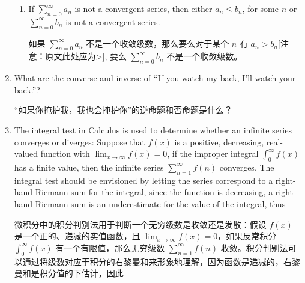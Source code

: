 \begin{enumerate}
{\begin{enumerate}
  如果没有云，就不可能下雨。
  \item If  $\sum_{n=0}^\infty a_n$ is not a convergent series, then either $a_n \leq b_n$, for some $n$ or 
  $\sum_{n=0}^\infty b_n$ is not a convergent series.
  
  如果 $\sum_{n=0}^\infty a_n$ 不是一个收敛级数，那么要么对于某个 $n$ 有 $a_n > b_n$[注意：原文此处应为>], 要么 $\sum_{n=0}^\infty b_n$ 不是一个收敛级数。
  \end{enumerate}
  }
  \rule{0pt}{0pt}
  
  
  \workbookpagebreak
  
  \item What are the converse and inverse of ``If you watch my back, I'll 
  watch your back.''?
  
  “如果你掩护我，我也会掩护你”的逆命题和否命题是什么？
  \wbvfill
  
  
  
  
  \item The integral test in Calculus is used to determine whether an
  infinite series converges or diverges:   Suppose that $f(x)$ is a positive,
  decreasing, 
  real-valued function with $\lim_{x \longrightarrow \infty} f(x) = 0$, if
  the improper integral
  $\int_0^\infty f(x)$ has a finite value, then the infinite series 
  $\sum_{n=1}^\infty f(n)$ converges.
  The integral test should be envisioned by letting the series correspond
  to a right-hand Riemann sum for the integral, since the function is decreasing,
  a right-hand Riemann sum is an underestimate for the value of the integral,
  thus
  
  微积分中的积分判别法用于判断一个无穷级数是收敛还是发散：假设 $f(x)$ 是一个正的、递减的实值函数，且 $\lim_{x \longrightarrow \infty} f(x) = 0$，如果反常积分 $\int_0^\infty f(x)$ 有一个有限值，那么无穷级数 $\sum_{n=1}^\infty f(n)$ 收敛。积分判别法可以通过将级数对应于积分的右黎曼和来形象地理解，因为函数是递减的，右黎曼和是积分值的下估计，因此
  

\end{enumerate}

